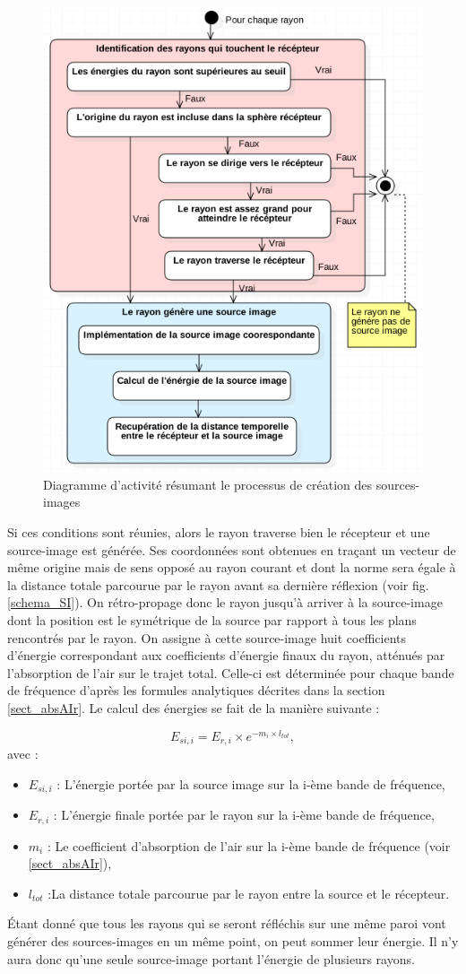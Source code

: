 \begin{figure}[h]
\centering
	\includegraphics[width=0.7\linewidth]{images/DiagSi}
	\caption{Diagramme d'activité résumant le processus de création des sources-images}
	\label{DiagSi}
\end{figure}


Si ces conditions sont réunies, alors le rayon traverse bien le récepteur et une source-image est générée. Ses coordonnées sont obtenues en traçant un vecteur de même origine mais de sens opposé au rayon courant et dont la norme sera égale à la distance totale parcourue par le rayon avant sa dernière réflexion (voir fig. \ref{schema_SI}). On rétro-propage donc le rayon jusqu'à arriver à la source-image dont la position est le symétrique de la source par rapport à tous les plans rencontrés par le rayon. On assigne à cette source-image huit coefficients d'énergie correspondant aux coefficients d'énergie finaux du rayon, atténués par l'absorption de l'air sur le trajet total. Celle-ci est déterminée pour chaque bande de fréquence d'après les formules analytiques décrites dans la section \ref{sect_absAIr}. Le calcul des énergies se fait de la manière suivante :

\begin{equation}
E_{si, i} = E_{r, i} \times e^{-m_i \times l_{tot}},
\end{equation}
avec : 
\begin{itemize}
\item $E_{si, i}$ : L'énergie portée par la source image sur la i-ème bande de fréquence,
\item $E_{r, i}$ : L'énergie finale portée par le rayon sur la i-ème bande de fréquence,
\item $m_i$ : Le coefficient d'absorption de l'air sur la i-ème bande de fréquence (voir \ref{sect_absAIr}),
\item $ l_{tot}$ :La distance totale parcourue par le rayon entre la source et le récepteur.
\end{itemize}
%
Étant donné que tous les rayons qui se seront réfléchis sur une même paroi vont générer des sources-images en un même point, on peut sommer leur énergie. Il n'y aura donc qu'une seule source-image portant l'énergie de plusieurs rayons.

